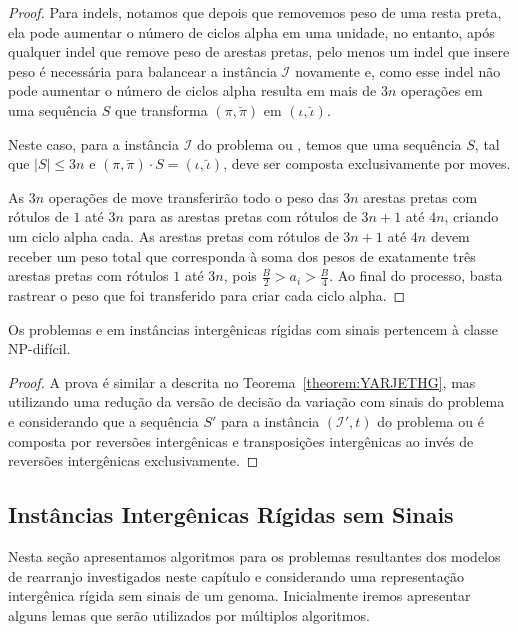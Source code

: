 \begin{proof}
Para indels, notamos que depois que removemos peso de uma resta preta, ela pode aumentar o número de ciclos alpha em uma unidade, no entanto, após qualquer indel que remove peso de arestas pretas, pelo menos um indel que insere peso é necessária para balancear a instância $\mathcal{I}$ novamente e, como esse indel não pode aumentar o número de ciclos alpha resulta em mais de $3n$ operações em uma sequência $S$ que transforma $(\pi,\breve\pi)$ em $(\iota,\breve\iota)$. 

Neste caso, para a instância $\mathcal{I}$ do problema \SbIRM{} ou \SbIRMI{}, temos que uma sequência $S$, tal que $|S| \le 3n$ e $(\pi,\breve\pi) \cdot S = (\iota,\breve\iota)$, deve ser composta exclusivamente por moves.

As $3n$ operações de move transferirão todo o peso das $3n$ arestas pretas com rótulos de $1$ até $3n$ para as arestas pretas com rótulos de $3n+1$ até $4n$, criando um ciclo alpha cada. As arestas pretas com rótulos de $3n+1$ até $4n$ devem receber um peso total que corresponda à soma dos pesos de exatamente três arestas pretas com rótulos $1$ até $3n$, pois $\frac{B}{2} > a_i > \frac{B}{4}$. Ao final do processo, basta rastrear o peso que foi transferido para criar cada ciclo alpha.
\end{proof}


\begin{theorem}\label{theorem:YACBNPHO}
Os problemas \SbIRTI{} e \SbIRTMI{} em instâncias intergênicas rígidas com sinais pertencem à classe NP-difícil.
\end{theorem}
\begin{proof}
A prova é similar a descrita no Teorema~\ref{theorem:YARJETHG}, mas utilizando uma redução da versão de decisão da variação com sinais do problema \SbRT{} e considerando que a sequência $S'$ para a instância $(\mathcal{I'},t)$ do problema \SbIRTI{} ou \SbIRTMI{} é composta por reversões intergênicas e transposições intergênicas ao invés de reversões intergênicas exclusivamente.
\end{proof}

\subsection{Instâncias Intergênicas Rígidas sem Sinais}

Nesta seção apresentamos algoritmos para os problemas resultantes dos modelos de rearranjo investigados neste capítulo e considerando uma representação intergênica rígida sem sinais de um genoma. Inicialmente iremos apresentar alguns lemas que serão utilizados por múltiplos algoritmos. 


